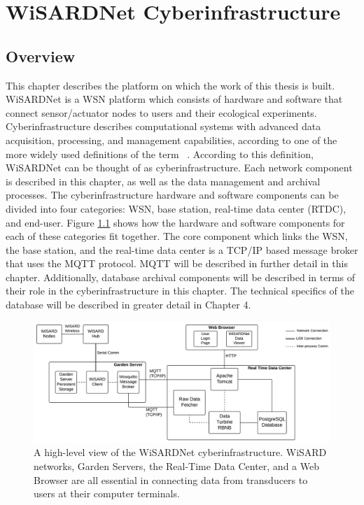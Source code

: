 
\chapter{WiSARDNet Cyberinfrastructure} %
\label{Chapter 3}
\lhead{} %

\section{Overview}
This chapter describes the platform on which the work of this thesis is built. WiSARDNet is a WSN platform which consists of hardware and software that connect sensor/actuator nodes to users and their ecological experiments. Cyberinfrastructure describes computational systems with advanced data acquisition, processing, and management capabilities, according to one of the more widely used definitions of the term ~\cite{stewart10}. According to this definition, WiSARDNet can be thought of as cyberinfrastructure. Each network component is described in this chapter, as well as the data management and archival processes. The cyberinfrastructure hardware and software components can be divided into four categories: WSN, base station, real-time data center (RTDC), and end-user. Figure \ref{fig:device_hierarchy} shows how the hardware and software components for each of these categories fit together. The core component which links the WSN, the base station, and the real-time data center is a TCP/IP based message broker that uses the MQTT protocol. MQTT will be described in further detail in this chapter. Additionally, database archival components will be described in terms of their role in the cyberinfrastructure in this chapter. The technical specifics of the database will be described in greater detail in Chapter 4.\\

\begin{figure}[H]
	\centering
	\includegraphics[width=\textwidth]{figures/wisardnet_ci_final}
	\caption{A high-level view of the WiSARDNet cyberinfrastructure. WiSARD networks, Garden Servers, the Real-Time Data Center, and a Web Browser are all essential in connecting data from transducers to users at their computer terminals. }
	\label{fig:device_hierarchy}
\end{figure}

